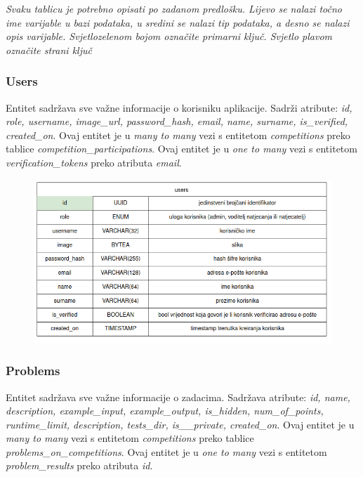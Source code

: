 				\textit{Svaku tablicu je potrebno opisati po zadanom predlošku. 
				Lijevo se nalazi točno ime varijable u bazi podataka, u sredini se nalazi tip podataka, 
				a desno se nalazi opis varijable. Svjetlozelenom bojom označite primarni ključ. Svjetlo plavom označite strani ključ}
				
				
				\subsubsection*{Users}
				
				Entitet  sadržava sve važne informacije o korisniku aplikacije. Sadrži atribute: \textit{id, role, username, image_url, password_hash, email, name, surname, is\_verified, created\_on}. Ovaj entitet je u \textit{many to many} vezi s entitetom \textit{competitions} preko tablice \textit{competition\_participations}. Ovaj entitet je u \textit{one to many} vezi s entitetom \textit{verification\_tokens} preko atributa \textit{email}. 
				\vspace{20mm}

				\begin{figure}[htbp]
					\centering
					\includegraphics[width=\linewidth]{slike/users_tablica.png}
				\end{figure}

				\vspace{30mm}

				\subsubsection*{Problems}

				Entitet  sadržava sve važne informacije o zadacima. Sadržava atribute: \textit{id, name, description, example\_input, example\_output, is\_hidden, num\_of\_points, runtime\_limit, description, tests\_dir, is_\_private, created\_on}. Ovaj entitet je u \textit{many to many} vezi s entitetom \textit{competitions} preko tablice \textit{problems\_on\_competitions}. Ovaj entitet je u \textit{one to many} vezi s entitetom \textit{problem\_results} preko atributa \textit{id}.

